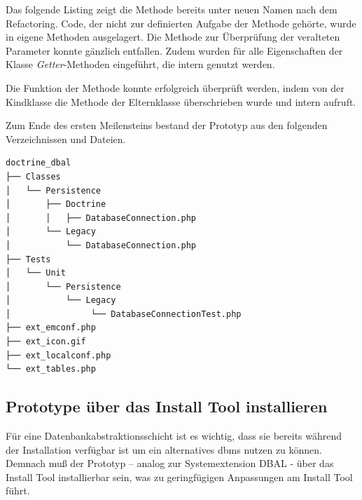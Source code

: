 Das folgende Listing zeigt die Methode bereits unter neuen Namen nach dem Refactoring. Code, der nicht zur definierten Aufgabe der Methode gehörte, wurde in eigene Methoden ausgelagert. Die Methode zur Überprüfung der veralteten Parameter konnte gänzlich entfallen. Zudem wurden für alle Eigenschaften der Klasse \textit{Getter}-Methoden eingeführt, die intern genutzt werden.


Die Funktion der Methode konnte erfolgreich überprüft werden, indem von der Kindklasse die Methode  der Elternklasse überschrieben wurde und intern  aufruft.

Zum Ende des ersten Meilensteins bestand der Prototyp aus den folgenden Verzeichnissen und Dateien.

\begin{Verbatim}[samepage=true]
doctrine_dbal
├── Classes
│   └── Persistence
│       ├── Doctrine
│       │   ├── DatabaseConnection.php
│       └── Legacy
│           └── DatabaseConnection.php
├── Tests
│   └── Unit
│       └── Persistence
│           └── Legacy
│                └── DatabaseConnectionTest.php
├── ext_emconf.php
├── ext_icon.gif
├── ext_localconf.php
└── ext_tables.php
\end{Verbatim}

\subsection{Prototype über das Install Tool installieren}
Für eine Datenbankabstraktionsschicht ist es wichtig, dass sie bereits während der Installation verfügbar ist um ein alternatives \gls{dbms} nutzen zu können. Demnach muß der Prototyp – analog zur Systemextension DBAL - über das Install Tool installierbar sein, was zu geringfügigen Anpassungen am Install Tool führt.

